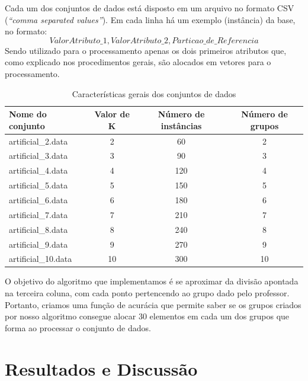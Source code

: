 \documentclass[12pt, a4paper]{article}
\begin{document}
Cada um dos conjuntos de dados está disposto em um arquivo no formato CSV (\emph{``comma separated values''}). Em cada linha há um exemplo (instância) da base, no formato: $$Valor Atributo\_1, Valor Atributo\_2, Particao\_de\_Referencia$$ Sendo utilizado para o processamento apenas os dois primeiros atributos que, como explicado nos procedimentos gerais, são alocados em vetores para o processamento.

\begin{table}[!ht]
\centering
\caption{Características gerais dos conjuntos de dados}
\label{conjDados}
	\begin{tabular}{|l|c|c|c|}
	\hline
	Nome do conjunto & Valor de K & Número de instâncias & Número de grupos \\
	\hline
		artificial\_2.data & 2 & 60 & 2 \\
	\hline
		artificial\_3.data & 3 & 90 & 3 \\
	\hline
		artificial\_4.data & 4 & 120 & 4 \\
	\hline
		artificial\_5.data & 5 & 150 & 5 \\
	\hline
		artificial\_6.data & 6 & 180 & 6 \\
	\hline
		artificial\_7.data & 7 & 210 & 7 \\
	\hline
		artificial\_8.data & 8 & 240 & 8 \\
	\hline
		artificial\_9.data & 9 & 270 & 9 \\
	\hline
		artificial\_10.data & 10 & 300 & 10 \\
	\hline
	\end{tabular}
\end{table}

O objetivo do algoritmo que implementamos é se aproximar da divisão apontada na terceira coluna, com cada ponto pertencendo ao grupo dado pelo professor. Portanto, criamos uma função de acurácia que permite saber se os grupos criados por nosso algoritmo consegue alocar 30 elementos em cada um dos grupos que forma ao processar o conjunto de dados.

\section{Resultados e Discussão}
\label{discussao}
\end{document}
